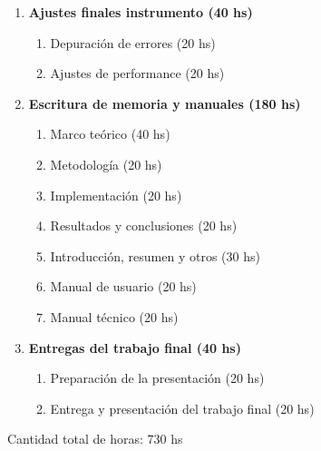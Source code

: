 \begin{enumerate}
	\item \textbf{Ajustes finales instrumento (40 hs)}
	\begin{enumerate}
		\item Depuración de errores (20 hs)
		\item Ajustes de performance (20 hs)
	\end{enumerate}
	
	\item \textbf{Escritura de memoria y manuales (180 hs)}
	\begin{enumerate}
		\item Marco teórico (40 hs)
		\item Metodología (20 hs)
		\item Implementación (20 hs)
		\item Resultados y conclusiones (20 hs)
		\item Introducción, resumen y otros (30 hs)
		\item Manual de usuario (20 hs)
		\item Manual técnico (20 hs)
	\end{enumerate}
	
	\item \textbf{Entregas del trabajo final (40 hs)}
	\begin{enumerate}
		\item Preparación de la presentación (20 hs)
		\item Entrega y presentación del trabajo final (20 hs)
	\end{enumerate}
\end{enumerate}


Cantidad total de horas: 730 hs


